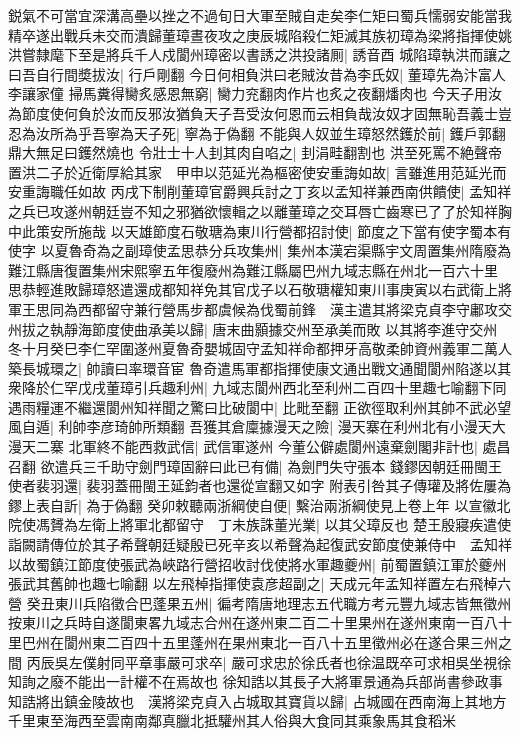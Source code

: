 鋭氣不可當宜深溝高壘以挫之不過旬日大軍至賊自走矣李仁矩曰蜀兵懦弱安能當我精卒遂出戰兵未交而潰歸董璋晝夜攻之庚辰城陷殺仁矩滅其族初璋為梁將指揮使姚洪嘗隸麾下至是將兵千人戍閬州璋密以書誘之洪投諸厠|{
	誘音酉}
城陷璋執洪而讓之曰吾自行間奬拔汝|{
	行戶剛翻}
今日何相負洪曰老賊汝昔為李氏奴|{
	董璋先為汴富人李讓家僮}
掃馬糞得臠炙感恩無窮|{
	臠力兖翻肉作片也炙之夜翻燔肉也}
今天子用汝為節度使何負於汝而反邪汝猶負天子吾受汝何恩而云相負哉汝奴才固無恥吾義士豈忍為汝所為乎吾寧為天子死|{
	寧為于偽翻}
不能與人奴並生璋怒然鑊於前|{
	鑊戶郭翻鼎大無足曰鑊然燒也}
令壯士十人刲其肉自啗之|{
	刲涓畦翻割也}
洪至死罵不絶聲帝置洪二子於近衛厚給其家　甲申以范延光為樞密使安重誨如故|{
	言雖進用范延光而安重誨職任如故}
丙戌下制削董璋官爵興兵討之丁亥以孟知祥兼西南供饋使|{
	孟知祥之兵已攻遂州朝廷豈不知之邪猶欲懷輯之以離董璋之交耳唇亡齒寒已了了於知祥胸中此策安所施哉}
以天雄節度石敬瑭為東川行營都招討使|{
	節度之下當有使字蜀本有使字}
以夏魯奇為之副璋使孟思恭分兵攻集州|{
	集州本漢宕渠縣宇文周置集州隋廢為難江縣唐復置集州宋熙寧五年復廢州為難江縣屬巴州九域志縣在州北一百六十里}
思恭輕進敗歸璋怒遣還成都知祥免其官戊子以石敬瑭權知東川事庚寅以右武衛上將軍王思同為西都留守兼行營馬步都虞候為伐蜀前鋒　漢主遣其將梁克貞李守鄘攻交州拔之執靜海節度使曲承美以歸|{
	唐末曲顥據交州至承美而敗}
以其將李進守交州　冬十月癸巳李仁罕圍遂州夏魯奇嬰城固守孟知祥命都押牙高敬柔帥資州義軍二萬人築長城環之|{
	帥讀曰率環音宦}
魯奇遣馬軍都指揮使康文通出戰文通聞閬州陷遂以其衆降於仁罕戊戌董璋引兵趣利州|{
	九域志閬州西北至利州二百四十里趣七喻翻下同}
遇雨糧運不繼還閬州知祥聞之驚曰比破閬中|{
	比毗至翻}
正欲徑取利州其帥不武必望風自遁|{
	利帥李彦琦帥所類翻}
吾獲其倉廩據漫天之險|{
	漫天寨在利州北有小漫天大漫天二寨}
北軍終不能西救武信|{
	武信軍遂州}
今董公僻處閬州遠棄劍閣非計也|{
	處昌召翻}
欲遣兵三千助守劍門璋固辭曰此已有備|{
	為劍門失守張本}
錢鏐因朝廷冊閩王使者裴羽還|{
	裴羽蓋冊閩王延鈞者也還從宣翻又如字}
附表引咎其子傳瓘及將佐屢為鏐上表自訢|{
	為于偽翻}
癸卯敕聽兩浙綱使自便|{
	繫治兩浙綱使見上卷上年}
以宣徽北院使馮贇為左衛上將軍北都留守　丁未族誅董光業|{
	以其父璋反也}
楚王殷寢疾遣使詣闕請傳位於其子希聲朝廷疑殷已死辛亥以希聲為起復武安節度使兼侍中　孟知祥以故蜀鎮江節度使張武為峽路行營招收討伐使將水軍趣夔州|{
	前蜀置鎮江軍於夔州張武其舊帥也趣七喻翻}
以左飛棹指揮使袁彦超副之|{
	天成元年孟知祥置左右飛棹六營}
癸丑東川兵陷徵合巴蓬果五州|{
	徧考隋唐地理志五代職方考元豐九域志皆無徵州按東川之兵時自遂閬東畧九域志合州在遂州東二百二十里果州在遂州東南一百八十里巴州在閬州東二百四十五里蓬州在果州東北一百八十五里徵州必在遂合果三州之間}
丙辰吳左僕射同平章事嚴可求卒|{
	嚴可求忠於徐氏者也徐温既卒可求相吳坐視徐知詢之廢不能出一計權不在焉故也}
徐知誥以其長子大將軍景通為兵部尚書參政事知誥將出鎮金陵故也　漢將梁克貞入占城取其寶貨以歸|{
	占城國在西南海上其地方千里東至海西至雲南南鄰真臘北抵驩州其人俗與大食同其乘象馬其食稻米}
